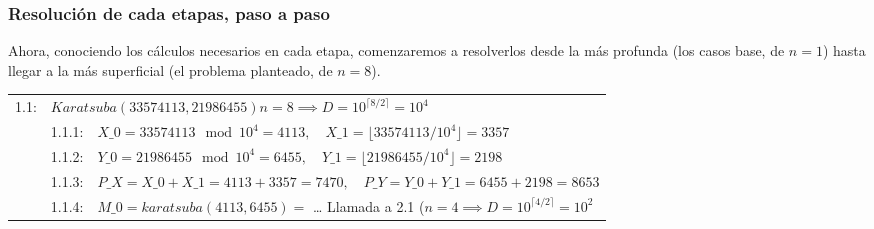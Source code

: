 \documentclass[titlepage,a4paper]{article}
\begin{document}
\newpage\subsubsection{Resolución de cada etapas, paso a paso}

Ahora, conociendo los cálculos necesarios en cada etapa, comenzaremos a resolverlos desde la más profunda (los casos base, de $n=1$) hasta llegar a la más superficial (el problema planteado, de $n=8$).
\par
\vspace{3em}
\par
\begin{longtable}[r]{lllllll}

1.1: & \multicolumn{6}{l}{ $ Karatsuba(33574113, 21986455) n=8 \implies D = 10^{\lceil 8/2\rceil} = 10^4$ }\\
     & 1.1.1:     & \multicolumn{5}{l}{$X\_0 = 33574113 \mod 10^4 = 4113, \quad X\_1 = \lfloor 33574113 / 10^4 \rfloor = 3357$}     \\
     & 1.1.2:     & \multicolumn{5}{l}{$Y\_0 = 21986455 \mod 10^4 = 6455, \quad Y\_1 = \lfloor 21986455 / 10^4 \rfloor = 2198$}     \\
     & 1.1.3:     & \multicolumn{5}{l}{$P\_X = X\_0+X\_1 = 4113 + 3357 = 7470,\quad P\_Y = Y\_0+Y\_1 = 6455 + 2198 = 8653$}     \\
     & 1.1.4:     & \multicolumn{5}{l}{$M\_0=karatsuba(4113,6455)=$ … Llamada a 2.1 ($n=4 \implies D=10^{\lceil 4/2\rceil} = 10^2$}     \\


\end{longtable}
\end{document}
